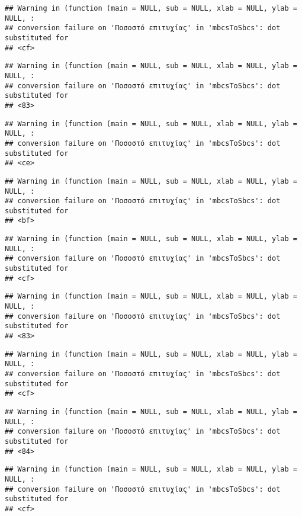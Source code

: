 \documentclass[
]{article}
\begin{document}
\begin{verbatim}
## Warning in (function (main = NULL, sub = NULL, xlab = NULL, ylab = NULL, :
## conversion failure on 'Ποσοστό επιτυχίας' in 'mbcsToSbcs': dot substituted for
## <cf>
\end{verbatim}

\begin{verbatim}
## Warning in (function (main = NULL, sub = NULL, xlab = NULL, ylab = NULL, :
## conversion failure on 'Ποσοστό επιτυχίας' in 'mbcsToSbcs': dot substituted for
## <83>
\end{verbatim}

\begin{verbatim}
## Warning in (function (main = NULL, sub = NULL, xlab = NULL, ylab = NULL, :
## conversion failure on 'Ποσοστό επιτυχίας' in 'mbcsToSbcs': dot substituted for
## <ce>
\end{verbatim}

\begin{verbatim}
## Warning in (function (main = NULL, sub = NULL, xlab = NULL, ylab = NULL, :
## conversion failure on 'Ποσοστό επιτυχίας' in 'mbcsToSbcs': dot substituted for
## <bf>
\end{verbatim}

\begin{verbatim}
## Warning in (function (main = NULL, sub = NULL, xlab = NULL, ylab = NULL, :
## conversion failure on 'Ποσοστό επιτυχίας' in 'mbcsToSbcs': dot substituted for
## <cf>
\end{verbatim}

\begin{verbatim}
## Warning in (function (main = NULL, sub = NULL, xlab = NULL, ylab = NULL, :
## conversion failure on 'Ποσοστό επιτυχίας' in 'mbcsToSbcs': dot substituted for
## <83>
\end{verbatim}

\begin{verbatim}
## Warning in (function (main = NULL, sub = NULL, xlab = NULL, ylab = NULL, :
## conversion failure on 'Ποσοστό επιτυχίας' in 'mbcsToSbcs': dot substituted for
## <cf>
\end{verbatim}

\begin{verbatim}
## Warning in (function (main = NULL, sub = NULL, xlab = NULL, ylab = NULL, :
## conversion failure on 'Ποσοστό επιτυχίας' in 'mbcsToSbcs': dot substituted for
## <84>
\end{verbatim}

\begin{verbatim}
## Warning in (function (main = NULL, sub = NULL, xlab = NULL, ylab = NULL, :
## conversion failure on 'Ποσοστό επιτυχίας' in 'mbcsToSbcs': dot substituted for
## <cf>
\end{verbatim}
\end{document}
